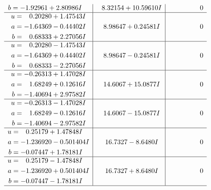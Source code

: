 \documentclass[1p]{elsarticle_modified}
\theoremstyle{definition}
\begin{document}
$$\begin{array}{c|c|c}
\begin{aligned}
b &= -1.92961 + 2.80986 I\end{aligned}
 & \phantom{-}8.32154 + 10.59610 I & \phantom{-0.000000 } 0 \\ \hline\begin{aligned}
u &= \phantom{-}0.20280 + 1.47543 I \\
a &= -1.64369 - 0.44402 I \\
b &= \phantom{-}0.68333 + 2.27056 I\end{aligned}
 & \phantom{-}8.98647 + 0.24581 I & \phantom{-0.000000 } 0 \\ \hline\begin{aligned}
u &= \phantom{-}0.20280 - 1.47543 I \\
a &= -1.64369 + 0.44402 I \\
b &= \phantom{-}0.68333 - 2.27056 I\end{aligned}
 & \phantom{-}8.98647 - 0.24581 I & \phantom{-0.000000 } 0 \\ \hline\begin{aligned}
u &= -0.26313 + 1.47028 I \\
a &= \phantom{-}1.68249 + 0.12616 I \\
b &= -1.40694 + 2.97582 I\end{aligned}
 & \phantom{-}14.6067 + 15.0877 I & \phantom{-0.000000 } 0 \\ \hline\begin{aligned}
u &= -0.26313 - 1.47028 I \\
a &= \phantom{-}1.68249 - 0.12616 I \\
b &= -1.40694 - 2.97582 I\end{aligned}
 & \phantom{-}14.6067 - 15.0877 I & \phantom{-0.000000 } 0 \\ \hline\begin{aligned}
u &= \phantom{-}0.25179 + 1.47848 I \\
a &= -1.236920 - 0.501404 I \\
b &= -0.07447 + 1.78181 I\end{aligned}
 & \phantom{-}16.7327 - 8.6480 I & \phantom{-0.000000 } 0 \\ \hline\begin{aligned}
u &= \phantom{-}0.25179 - 1.47848 I \\
a &= -1.236920 + 0.501404 I \\
b &= -0.07447 - 1.78181 I\end{aligned}
 & \phantom{-}16.7327 + 8.6480 I & \phantom{-0.000000 } 0\\
 \hline 
 \end{array}$$\newpage$$\begin{array}{c|c|c}  

\end{array}$$
\end{document}
